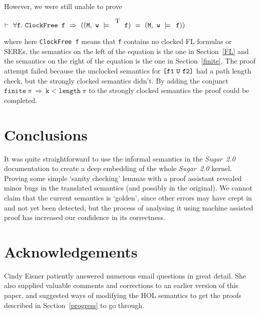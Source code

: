 \documentclass{llncs}
\newcommand{\T}{\texttt{\small\rm{T}}}
\newcommand{\sSem}[4]{(\tt{#1,~#2~\models^{\hspace*{-2.3mm}\raisebox{1mm}{\tt#3}}~#4})}
\renewcommand{\c}{{\hspace*{2.5mm}}}
\newcommand{\fUntil}[2]{\texttt{[}#1~\texttt{U}~#2\texttt{]}}
\newcommand\Sugar{{\it{Sugar~2.0}}\xspace}
\renewcommand{\t}[1]{\texttt{#1}}
\begin{document}
\medskip

However, we were still unable to prove

\medskip

$\vdash~\forall{\t{f}}.~\t{ClockFree~f}~\Rightarrow~(\sSem{M}{w}{\T}{f}~=~\sSem{M}{w}{\c}{f})$

\medskip
where here \t{ClockFree~f} means that \t{f} contains no clocked FL
formulas or SEREs, the semantics on the left of the equation is the
one in Section~\ref{FL} and the semantics on the right of the equation
is the one in Section~\ref{finite}.  The proof attempt failed because
the unclocked semantics for $\tt{\fUntil{f1}{f2}}$ had a path length
check, but the strongly clocked semantics didn't. By adding the
conjunct $\t{finite}~\pi~\Rightarrow~\t{k}<\t{length}~\pi$ to the
strongly clocked semantics the proof could be completed.

\section{Conclusions}

It was quite straightforward to use the informal semantics in the
\Sugar documentation to create a deep
embedding of the whole \Sugar kernel.  Proving some simple `sanity
checking' lemmas with a proof assistant revealed minor bugs in the
translated semantics (and possibly in the original). We cannot claim
that the current semantics is `golden', since other errors may have
crept in and not yet been detected, but the process of analysing it
using machine assisted proof has increased our confidence in its
correctness.

\section{Acknowledgements}

Cindy Eisner patiently answered numerous email questions
in great detail. She also supplied valuable comments and corrections
to an earlier version of this paper, and suggested
ways of modifying the HOL semantics to get the proofs described in Section~\ref{progress} to go through.

{}
\end{document}
